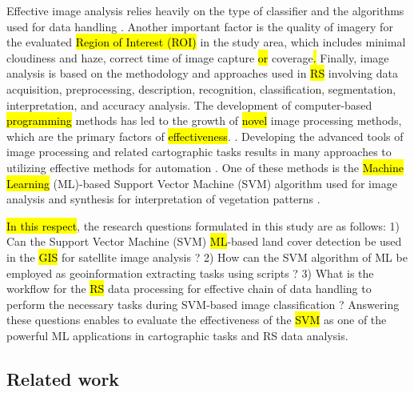 \documentclass[earth,article,submit,pdftex,moreauthors]{Definitions/mdpi}
\begin{document}
{Effective image analysis relies heavily on} the type of {classifier} and the algorithms used for data handling\hl{ }\cite{Lemenkova202212}. Another important factor {is} the quality of imagery for the evaluated \hl{Region of Interest (ROI)} in {the} study area{, which includes} minimal cloudiness and haze, correct time of image capture \hl{or} coverage\hl{.} Finally, {image analysis is based on} the methodology and approaches {used in} \hl{RS} {involving} data acquisition, preprocessing, description, recognition, classification, segmentation, interpretation, and accuracy analysis. The {development} of {computer-based} \hl{programming} methods {has led to} the {growth} of \hl{novel} {image processing} methods, {which} are the primary factors of \hl{effectiveness}. \cite{Duncan,jimaging9050098,Purkis,info14040249,DIOUF2001129}. Developing the advanced tools of image processing and related cartographic tasks results in many approaches to utilizing effective methods {for automation} \cite{SUOMALAINEN2021112691,OlsonAnderson,Lemenkova202227,Ali,Olsonetal2019,Lemenkova202229}. {One of these methods is the \hl{Machine Learning} (ML)-based Support Vector Machine (SVM) algorithm used for} image analysis and synthesis for interpretation of vegetation patterns \cite{PUERTAS2013112,PETROPOULOS201170,ANEES2024102732,IBRAHIM2024100561}.

\hl{In this respect}{, the research questions formulated in this study are as follows: 1) Can the Support Vector Machine (SVM) \hl{ML}-based land cover detection be used in the\hl{ GIS} for satellite image analysis ? 2) How can the SVM algorithm of ML be employed as geoinformation extracting tasks using scripts ? 3) What is the workflow for the \hl{RS} data processing for effective chain of data handling to perform\hl{ }the necessary tasks during SVM-based image classification ? Answering these questions enables to evaluate the effectiveness of the \hl{SVM} as one of the powerful ML applications in cartographic tasks and RS data analysis.}

\subsection{Related work}
\end{document}
